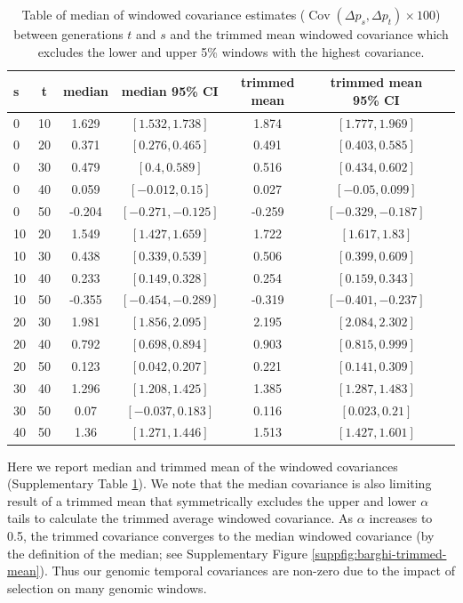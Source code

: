 \documentclass[11pt]{article}
\DeclareMathOperator{\cov}{Cov}
\begin{document}
{{\begin{table}
\begin{tabular}{l c c c c c c}
    s & t & median & median 95\% CI & trimmed mean & trimmed mean 95\% CI \\ \hline
    0 & 10 & 1.629 & $[1.532, 1.738]$ & 1.874 & $[1.777, 1.969]$ \\
    0 & 20 & 0.371 & $[0.276, 0.465]$ & 0.491 & $[0.403, 0.585]$ \\
    0 & 30 & 0.479 & $[0.4, 0.589]$ & 0.516 & $[0.434, 0.602]$ \\
    0 & 40 & 0.059 & $[-0.012, 0.15]$ & 0.027 & $[-0.05, 0.099]$ \\
    0 & 50 & -0.204 & $[-0.271, -0.125]$ & -0.259 & $[-0.329, -0.187]$ \\
    10 & 20 & 1.549 & $[1.427, 1.659]$ & 1.722 & $[1.617, 1.83]$ \\
    10 & 30 & 0.438 & $[0.339, 0.539]$ & 0.506 & $[0.399, 0.609]$ \\
    10 & 40 & 0.233 & $[0.149, 0.328]$ & 0.254 & $[0.159, 0.343]$ \\
    10 & 50 & -0.355 & $[-0.454, -0.289]$ & -0.319 & $[-0.401, -0.237]$ \\
    20 & 30 & 1.981 & $[1.856, 2.095]$ & 2.195 & $[2.084, 2.302]$ \\
    20 & 40 & 0.792 & $[0.698, 0.894]$ & 0.903 & $[0.815, 0.999]$ \\
    20 & 50 & 0.123 & $[0.042, 0.207]$ & 0.221 & $[0.141, 0.309]$ \\
    30 & 40 & 1.296 & $[1.208, 1.425]$ & 1.385 & $[1.287, 1.483]$ \\
    30 & 50 & 0.07 & $[-0.037, 0.183]$ & 0.116 & $[0.023, 0.21]$ \\
    40 & 50 & 1.36 & $[1.271, 1.446]$ & 1.513 & $[1.427, 1.601]$ \\


   \end{tabular}
   \caption{Table of median of windowed covariance estimates ($\cov(\Delta p_s,
     \Delta p_t) \times 100$) between generations $t$ and $s$ and the trimmed
     mean windowed covariance which excludes the lower and upper 5\% windows
     with the highest covariance.}
  \label{supp:table-trimmed-mean}

\end{table}



Here we report median and trimmed mean of the windowed covariances
(Supplementary Table \ref{supp:table-trimmed-mean}). We note that the median
covariance is also limiting result of a trimmed mean that symmetrically
excludes the upper and lower $\alpha$ tails to calculate the trimmed average
windowed covariance. As $\alpha$ increases to 0.5, the trimmed covariance
converges to the median windowed covariance (by the definition of the median;
see Supplementary Figure \ref{suppfig:barghi-trimmed-mean}). Thus our genomic
temporal covariances are non-zero due to the impact of selection on many
genomic windows.  


}}
\end{document}
